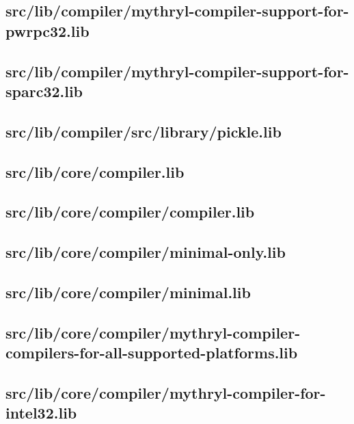 \subsection{src/lib/compiler/mythryl-compiler-support-for-pwrpc32.lib}


\subsection{src/lib/compiler/mythryl-compiler-support-for-sparc32.lib}


\subsection{src/lib/compiler/src/library/pickle.lib}


\subsection{src/lib/core/compiler.lib}


\subsection{src/lib/core/compiler/compiler.lib}


\subsection{src/lib/core/compiler/minimal-only.lib}


\subsection{src/lib/core/compiler/minimal.lib}


\subsection{src/lib/core/compiler/mythryl-compiler-compilers-for-all-supported-platforms.lib}


\subsection{src/lib/core/compiler/mythryl-compiler-for-intel32.lib}


